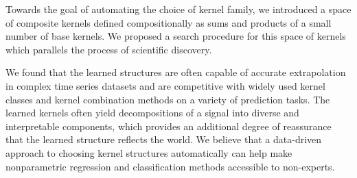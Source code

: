 \documentclass[twoside]{article}
\begin{document}

%



Towards the goal of automating the choice of kernel family, we introduced a space of composite kernels defined compositionally as sums and products of a small number of base kernels.
We proposed a search procedure for this space of kernels which parallels the process of scientific discovery.

We found that the learned structures are often capable of accurate extrapolation in complex time series datasets and are competitive with widely used kernel classes and kernel combination methods on a variety of prediction tasks.
The learned kernels often yield decompositions of a signal into diverse and interpretable components, which provides an additional degree of reassurance that the learned structure reflects the world.
We believe that a data-driven approach to choosing kernel structures automatically can help make nonparametric regression and classification methods accessible to non-experts.
\end{document}
